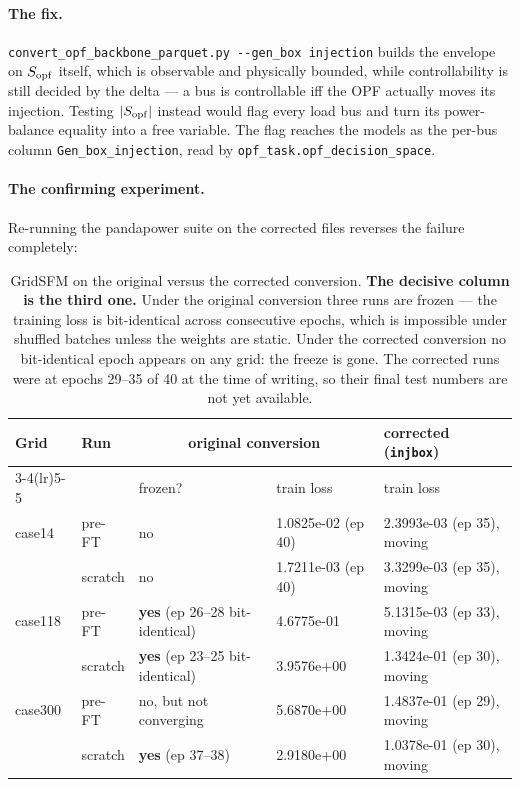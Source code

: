 \documentclass[10pt]{article}
\begin{document}
\paragraph{The fix.} \texttt{convert\_opf\_backbone\_parquet.py -{}-gen\_box
injection} builds the envelope on \(S_{\rm opf}\) itself, which is observable and
physically bounded, while controllability is still decided by the delta --- a bus
is controllable iff the OPF actually moves its injection. Testing
\(|S_{\rm opf}|\) instead would flag every load bus and turn its power-balance
equality into a free variable. The flag reaches the models as the per-bus column
\texttt{Gen\_box\_injection}, read by \texttt{opf\_task.opf\_decision\_space}.

\paragraph{The confirming experiment.} Re-running the pandapower suite on the
corrected files reverses the failure completely:

\begin{table}[H]
\centering
\small
\begin{tabular}{lllll}
\toprule
Grid & Run & \multicolumn{2}{c}{original conversion} & corrected (\texttt{injbox}) \\
\cmidrule(lr){3-4}\cmidrule(lr){5-5}
 & & frozen? & train loss & train loss \\
\midrule
case14  & pre-FT  & no  & 1.0825e-02 (ep 40) & 2.3993e-03 (ep 35), moving \\
        & scratch & no  & 1.7211e-03 (ep 40) & 3.3299e-03 (ep 35), moving \\
case118 & pre-FT  & \textbf{yes} (ep 26--28 bit-identical) & 4.6775e-01 & 5.1315e-03 (ep 33), moving \\
        & scratch & \textbf{yes} (ep 23--25 bit-identical) & 3.9576e+00 & 1.3424e-01 (ep 30), moving \\
case300 & pre-FT  & no, but not converging & 5.6870e+00 & 1.4837e-01 (ep 29), moving \\
        & scratch & \textbf{yes} (ep 37--38) & 2.9180e+00 & 1.0378e-01 (ep 30), moving \\
\bottomrule
\end{tabular}
\caption{GridSFM on the original versus the corrected conversion. \textbf{The
decisive column is the third one.} Under the original conversion three runs are
frozen --- the training loss is bit-identical across consecutive epochs, which
is impossible under shuffled batches unless the weights are static. Under the
corrected conversion no bit-identical epoch appears on any grid: the freeze is
gone. The corrected runs were at epochs 29--35 of 40 at the time of writing, so
their final test numbers are not yet available.}
\end{table}
\end{document}
